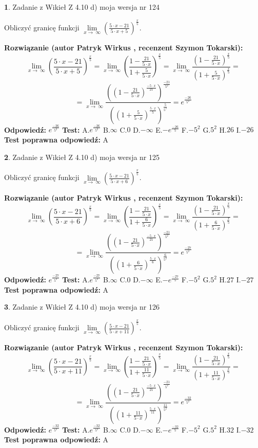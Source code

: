 \documentclass[12pt, a4paper]{article}
\theoremstyle{definition} %
\newtheorem{zad}{}
\newcommand{\zadStart}[1]{\begin{zad}#1\newline}
\newcommand{\zadStop}{\end{zad}}
\newcommand{\rozwStart}[2]{\noindent \textbf{Rozwiązanie (autor #1 , recenzent #2): }\newline}
\newcommand{\rozwStop}{\newline}
\newcommand{\odpStart}{\noindent \textbf{Odpowiedź:}\newline}
\newcommand{\odpStop}{\newline}
\newcommand{\testStart}{\noindent \textbf{Test:}\newline}
\newcommand{\testStop}{\newline}
\newcommand{\kluczStart}{\noindent \textbf{Test poprawna odpowiedź:}\newline}
\newcommand{\kluczStop}{\newline}
\begin{document}
\zadStart{Zadanie z Wikieł Z 4.10 d) moja wersja nr 124}


Obliczyć granicę funkcji  $\lim\limits_{x\to\ \infty}(\frac{5\cdot x-21}{5\cdot x+5})^{\frac{x}{5}}$.
\zadStop
\rozwStart{Patryk Wirkus}{Szymon Tokarski}
$$\lim\limits_{x\to\ \infty}(\frac{5\cdot x-21}{5\cdot x+5})^{\frac{x}{5}} = \lim\limits_{x\to\ \infty}(\frac{1-\frac{21}{5\cdot x}}{1+\frac{5}{5\cdot x}})^{\frac{x}{5}}=\lim\limits_{x\to\ \infty}\frac{(1-\frac{21}{5\cdot x})^{\frac{x}{5}}}{(1+\frac{5}{5\cdot x})^{\frac{x}{5}}}=$$
$$=\lim\limits_{x\to\ \infty}\frac{((1-\frac{21}{5\cdot x})^{\frac{-5\cdot x}{21}})^{\frac{-21}{5^{2}}}}{((1+\frac{5}{5\cdot x})^{\frac{5\cdot x}{5}})^{\frac{5}{5^{2}}}}=e^{\frac{-26}{5^{2}}}$$
\rozwStop
\odpStart
$e^{\frac{-26}{5^{2}}}$
\odpStop
\testStart
A.$e^{\frac{-26}{5^{2}}}$ B.$\infty$ C.$0$ D.$-\infty$ E.$-e^{\frac{-26}{5}}$
F.$-5^{2}$ G.$5^{2}$
H.$26$
I.$-26$
\testStop
\kluczStart
A
\kluczStop



\zadStart{Zadanie z Wikieł Z 4.10 d) moja wersja nr 125}


Obliczyć granicę funkcji  $\lim\limits_{x\to\ \infty}(\frac{5\cdot x-21}{5\cdot x+6})^{\frac{x}{5}}$.
\zadStop
\rozwStart{Patryk Wirkus}{Szymon Tokarski}
$$\lim\limits_{x\to\ \infty}(\frac{5\cdot x-21}{5\cdot x+6})^{\frac{x}{5}} = \lim\limits_{x\to\ \infty}(\frac{1-\frac{21}{5\cdot x}}{1+\frac{6}{5\cdot x}})^{\frac{x}{5}}=\lim\limits_{x\to\ \infty}\frac{(1-\frac{21}{5\cdot x})^{\frac{x}{5}}}{(1+\frac{6}{5\cdot x})^{\frac{x}{5}}}=$$
$$=\lim\limits_{x\to\ \infty}\frac{((1-\frac{21}{5\cdot x})^{\frac{-5\cdot x}{21}})^{\frac{-21}{5^{2}}}}{((1+\frac{6}{5\cdot x})^{\frac{5\cdot x}{6}})^{\frac{6}{5^{2}}}}=e^{\frac{-27}{5^{2}}}$$
\rozwStop
\odpStart
$e^{\frac{-27}{5^{2}}}$
\odpStop
\testStart
A.$e^{\frac{-27}{5^{2}}}$ B.$\infty$ C.$0$ D.$-\infty$ E.$-e^{\frac{-27}{5}}$
F.$-5^{2}$ G.$5^{2}$
H.$27$
I.$-27$
\testStop
\kluczStart
A
\kluczStop



\zadStart{Zadanie z Wikieł Z 4.10 d) moja wersja nr 126}


Obliczyć granicę funkcji  $\lim\limits_{x\to\ \infty}(\frac{5\cdot x-21}{5\cdot x+11})^{\frac{x}{5}}$.
\zadStop
\rozwStart{Patryk Wirkus}{Szymon Tokarski}
$$\lim\limits_{x\to\ \infty}(\frac{5\cdot x-21}{5\cdot x+11})^{\frac{x}{5}} = \lim\limits_{x\to\ \infty}(\frac{1-\frac{21}{5\cdot x}}{1+\frac{11}{5\cdot x}})^{\frac{x}{5}}=\lim\limits_{x\to\ \infty}\frac{(1-\frac{21}{5\cdot x})^{\frac{x}{5}}}{(1+\frac{11}{5\cdot x})^{\frac{x}{5}}}=$$
$$=\lim\limits_{x\to\ \infty}\frac{((1-\frac{21}{5\cdot x})^{\frac{-5\cdot x}{21}})^{\frac{-21}{5^{2}}}}{((1+\frac{11}{5\cdot x})^{\frac{5\cdot x}{11}})^{\frac{11}{5^{2}}}}=e^{\frac{-32}{5^{2}}}$$
\rozwStop
\odpStart
$e^{\frac{-32}{5^{2}}}$
\odpStop
\testStart
A.$e^{\frac{-32}{5^{2}}}$ B.$\infty$ C.$0$ D.$-\infty$ E.$-e^{\frac{-32}{5}}$
F.$-5^{2}$ G.$5^{2}$
H.$32$
I.$-32$
\testStop
\kluczStart
A
\kluczStop
\end{document}
